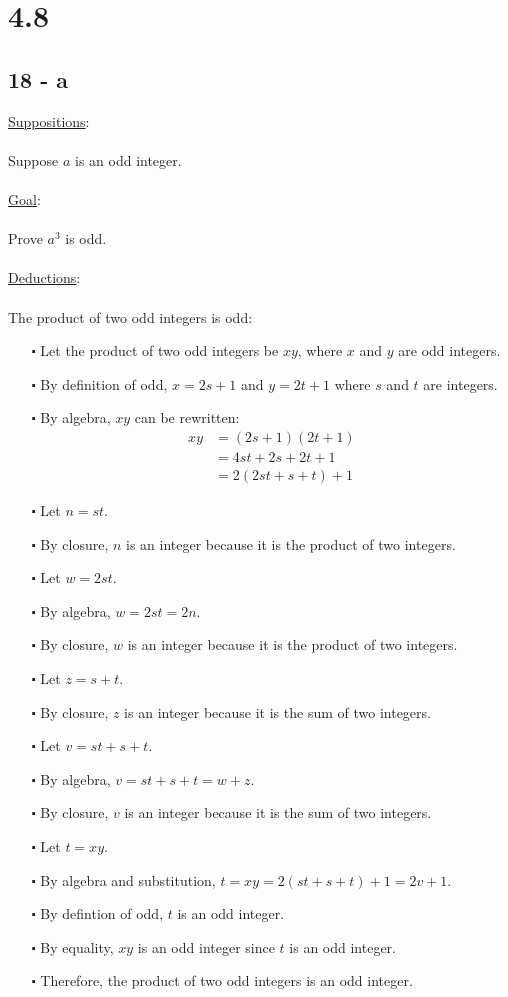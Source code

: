 \documentclass[12pt]{article}
\begin{document}
\section*{4.8}
\subsection*{18 - a}
\underline{Suppositions}:
\\ \\
Suppose $a$ is an odd integer.
\\ \\
\underline{Goal}:
\\ \\
Prove $a^3$ is odd.
\\ \\
\underline{Deductions}:
\\ \\
The product of two odd integers is odd:
\begin{itemize}
  \item [$\centerdot$] Let the product of two odd integers be $xy$, where $x$ and $y$ are odd integers.
  \item [$\centerdot$] By definition of odd, $x=2s+1$ and $y=2t+1$ where $s$ and $t$ are integers.
  \item [$\centerdot$] By algebra, $xy$ can be rewritten:
  \begin{align*}
    xy &= (2s+1)(2t+1) \\
    &= 4st+2s+2t+1 \\
    &= 2(2st+s+t)+1
  \end{align*}
  \item [$\centerdot$] Let $n = st$.
  \item [$\centerdot$] By closure, $n$ is an integer because it is the product of two integers.
  \item [$\centerdot$] Let $w = 2st$.
  \item [$\centerdot$] By algebra, $w = 2st = 2n$.
  \item [$\centerdot$] By closure, $w$ is an integer because it is the product of two integers.
  \item [$\centerdot$] Let $z = s + t$.
  \item [$\centerdot$] By closure, $z$ is an integer because it is the sum of two integers.
  \item [$\centerdot$] Let $v = st+s+t$.
  \item [$\centerdot$] By algebra, $v = st+s+t= w+z$.
  \item [$\centerdot$] By closure, $v$ is an integer because it is the sum of two integers.
  \item [$\centerdot$] Let $t=xy$.
  \item [$\centerdot$] By algebra and substitution, $t = xy = 2(st+s+t)+1 = 2v + 1$.
  \item [$\centerdot$] By defintion of odd, $t$ is an odd integer.
  \item [$\centerdot$] By equality, $xy$ is an odd integer since $t$ is an odd integer.
  \item [$\centerdot$] Therefore, the product of two odd integers is an odd integer.
\end{itemize}
\end{document}
